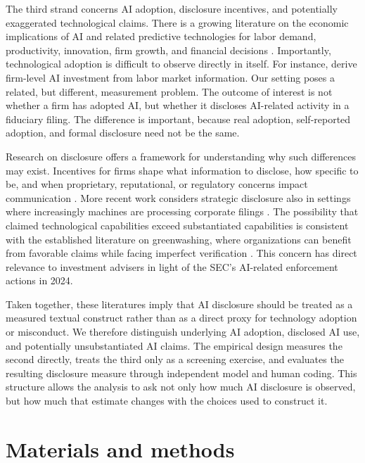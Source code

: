 \documentclass[utf8]{FrontiersinHarvard}
\begin{document}
The third strand concerns AI adoption, disclosure incentives, and potentially exaggerated technological claims. There is a growing literature on the economic implications of AI and related predictive technologies for labor demand, productivity, innovation, firm growth, and financial decisions \citep{agrawal2018,dacunto2019,acemoglu2022,eisfeldt2023,noy2023,babina2024,brynjolfsson2025}. Importantly, technological adoption is difficult to observe directly in itself. For instance, \citet{babina2024} derive firm-level AI investment from labor market information. Our setting poses a related, but different, measurement problem. The outcome of interest is not whether a firm has adopted AI, but whether it discloses AI-related activity in a fiduciary filing. The difference is important, because real adoption, self-reported adoption, and formal disclosure need not be the same.

Research on disclosure offers a framework for understanding why such differences may exist. Incentives for firms shape what information to disclose, how specific to be, and when proprietary, reputational, or regulatory concerns impact communication \citep{verrecchia2001,healy2001,leuz2016,blankespoor2020}. More recent work considers strategic disclosure also in settings where increasingly machines are processing corporate filings \citep{cao2024}. The possibility that claimed technological capabilities exceed substantiated capabilities is consistent with the established literature on greenwashing, where organizations can benefit from favorable claims while facing imperfect verification \citep{delmas2011,lyon2015}. This concern has direct relevance to investment advisers in light of the SEC's AI-related enforcement actions in 2024.

Taken together, these literatures imply that AI disclosure should be treated as a measured textual construct rather than as a direct proxy for technology adoption or misconduct. We therefore distinguish underlying AI adoption, disclosed AI use, and potentially unsubstantiated AI claims. The empirical design measures the second directly, treats the third only as a screening exercise, and evaluates the resulting disclosure measure through independent model and human coding. This structure allows the analysis to ask not only how much AI disclosure is observed, but how much that estimate changes with the choices used to construct it.

\section{Materials and methods}
\end{document}
